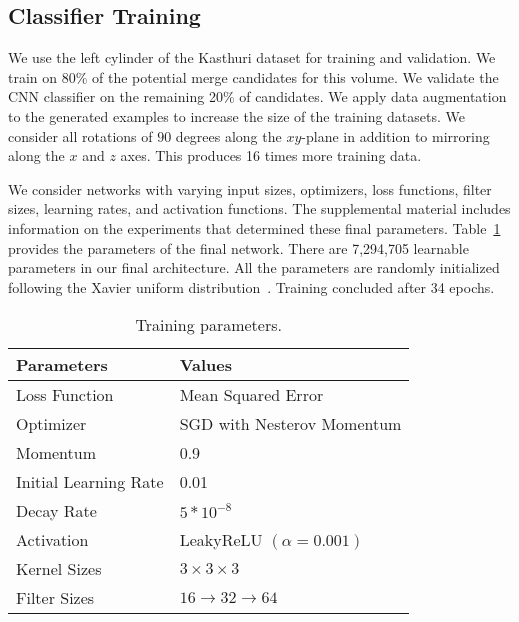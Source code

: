 
\subsection{Classifier Training}
\label{sec:network-parameters}

We use the left cylinder of the Kasthuri dataset for training and validation. We train on 80\% of the potential merge candidates for this volume.
We validate the CNN classifier on the remaining 20\% of candidates. We apply data augmentation to the generated examples to increase the size of the training datasets. We consider all rotations of $90$ degrees along the $xy$-plane in addition to mirroring along the $x$ and $z$ axes. This produces 16 times more training data.

We consider networks with varying input sizes, optimizers, loss functions, filter sizes, learning rates, and activation functions. The supplemental material includes information on the experiments that determined these final parameters. Table~\ref{table:architecture} provides the parameters of the final network. There are 7,294,705 learnable parameters in our final architecture. All the parameters are randomly initialized following the Xavier uniform distribution~\cite{glorot2010understanding}. Training concluded after 34 epochs.

\begin{table}[h!]
	\centering
	\begin{tabular}{l l} \hline
		\textbf{Parameters} & \textbf{Values} \\ \hline
		Loss Function & Mean Squared Error \\
		Optimizer & SGD  with Nesterov Momentum \\
		Momentum & 0.9 \\
		Initial Learning Rate & 0.01 \\
		Decay Rate & $5 * 10^{-8}$ \\
		Activation & LeakyReLU $(\alpha = 0.001)$ \\
		Kernel Sizes & $3 \times 3 \times 3$ \\
		Filter Sizes & $16 \to 32 \to 64$ \\ \hline
	\end{tabular}
	\caption{Training parameters.}
	\label{table:architecture}
\end{table}





